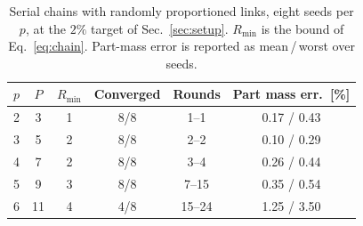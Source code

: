 \begin{table}[t]
\caption{Serial chains with randomly proportioned links, eight seeds per $p$,
at the $2\%$ target of Sec.~\ref{sec:setup}. $R_{\min}$ is the bound of
Eq.~\eqref{eq:chain}. Part-mass error is reported as mean\,/\,worst over seeds.}
\label{tab:scaling}
\centering
\scriptsize
\setlength{\tabcolsep}{4pt}
\begin{tabular}{cccccc}
\hline
$p$ & $P$ & $R_{\min}$ & Converged & Rounds & Part mass err.\ [\%] \\
\hline
2 &  3 & 1 & 8/8 & 1--1   & 0.17 / 0.43 \\
3 &  5 & 2 & 8/8 & 2--2   & 0.10 / 0.29 \\
4 &  7 & 2 & 8/8 & 3--4   & 0.26 / 0.44 \\
5 &  9 & 3 & 8/8 & 7--15  & 0.35 / 0.54 \\
6 & 11 & 4 & 4/8 & 15--24 & 1.25 / 3.50 \\
\hline
\end{tabular}
\end{table}